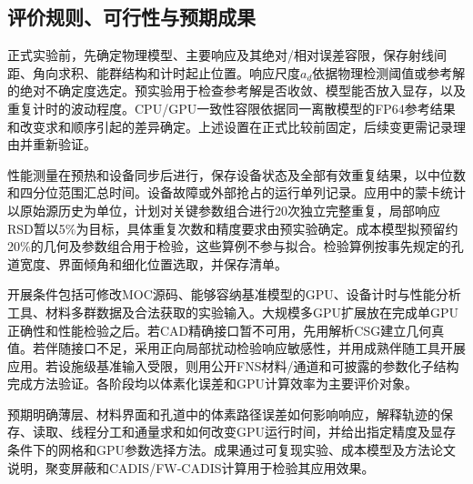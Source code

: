 \documentclass[UTF8, zihao=-4, fontset=none, a4paper]{ctexart}
\begin{document}
\subsection{评价规则、可行性与预期成果}

正式实验前，先确定物理模型、主要响应及其绝对/相对误差容限，保存射线间距、角向求积、能群结构和计时起止位置。响应尺度\(a_d\)依据物理检测阈值或参考解的绝对不确定度选定。预实验用于检查参考解是否收敛、模型能否放入显存，以及重复计时的波动程度。CPU/GPU一致性容限依据同一离散模型的FP64参考结果和改变求和顺序引起的差异确定。上述设置在正式比较前固定，后续变更需记录理由并重新验证。

性能测量在预热和设备同步后进行，保存设备状态及全部有效重复结果，以中位数和四分位范围汇总时间。设备故障或外部抢占的运行单列记录。应用中的蒙卡统计以原始源历史为单位，计划对关键参数组合进行20次独立完整重复，局部响应RSD暂以5\%为目标，具体重复次数和精度要求由预实验确定。成本模型拟预留约20\%的几何及参数组合用于检验，这些算例不参与拟合。检验算例按事先规定的孔道宽度、界面倾角和细化位置选取，并保存清单。

开展条件包括可修改MOC源码、能够容纳基准模型的GPU、设备计时与性能分析工具、材料多群数据及合法获取的实验输入。大规模多GPU扩展放在完成单GPU正确性和性能检验之后。若CAD精确接口暂不可用，先用解析CSG建立几何真值。若伴随接口不足，采用正向局部扰动检验响应敏感性，并用成熟伴随工具开展应用。若设施级基准输入受限，则用公开FNS材料/通道和可披露的参数化子结构完成方法验证。各阶段均以体素化误差和GPU计算效率为主要评价对象。

预期明确薄层、材料界面和孔道中的体素路径误差如何影响响应，解释轨迹的保存、读取、线程分工和通量求和如何改变GPU运行时间，并给出指定精度及显存条件下的网格和GPU参数选择方法。成果通过可复现实验、成本模型及方法论文说明，聚变屏蔽和CADIS/FW-CADIS计算用于检验其应用效果。
\end{document}

